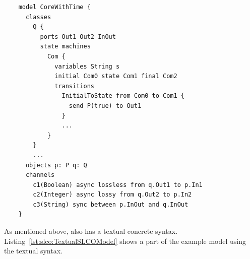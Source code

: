 \begin{listing}
  \lstset{
    language=slco,
    label=lst:slco:TextualSLCOModel,
    caption=Part of a textual \SLCO model
  }
  \begin{lstlisting}
    model CoreWithTime {
      classes
        Q {
          ports Out1 Out2 InOut
          state machines
            Com {
              variables String s
              initial Com0 state Com1 final Com2
              transitions
                InitialToState from Com0 to Com1 {
                  send P(true) to Out1
                }
                ...
            }
        }
        ...
      objects p: P q: Q
      channels
        c1(Boolean) async lossless from q.Out1 to p.In1
        c2(Integer) async lossy from q.Out2 to p.In2
        c3(String) sync between p.InOut and q.InOut
    }
  \end{lstlisting}
\end{listing}

As mentioned above, \SLCO also has a textual concrete syntax.
Listing~\ref{lst:slco:TextualSLCOModel} shows a part of the example model using the textual syntax. 